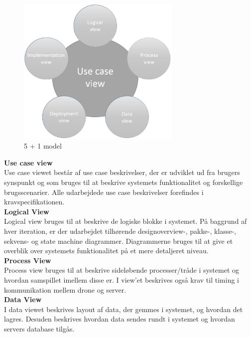\begin{figure}[H]
	\centering
	\includegraphics[width=0.7\textwidth]{Billeder/Udviklingsproces/n+1}
	\caption{5 + 1 model}
	\label{fig:n+1}
\end{figure}

\newpage


\textbf{Use case view}\\
Use case viewet består af use case beskrivelser, der er udviklet ud fra brugers synspunkt og som bruges til at beskrive systemets funktionalitet og forskellige brugsscenarier. Alle udarbejdede use case beskrivelser forefindes i kravspecifikationen. \\

\textbf{Logical View}\\
Logical view bruges til at beskrive de logiske blokke i systemet. På baggrund af hver iteration, er der udarbejdet tilhørende designoverview-, pakke-, klasse-, sekvens- og state machine diagrammer. Diagrammerne bruges til at give et overblik over systemets funktionalitet på et mere detaljeret niveau.\\


\textbf{Process View}\\
Process view bruges til at beskrive sideløbende processer/tråde i systemet og hvordan samspillet imellem disse er. I view'et beskrives også krav til timing i kommunikation mellem drone og server.\\


\textbf{Data View}\\
I data viewet beskrives layout af data, der gemmes i systemet, og hvordan det lagres. Desuden beskrives hvordan data sendes rundt i systemet og hvordan servers database tilgås.\\



